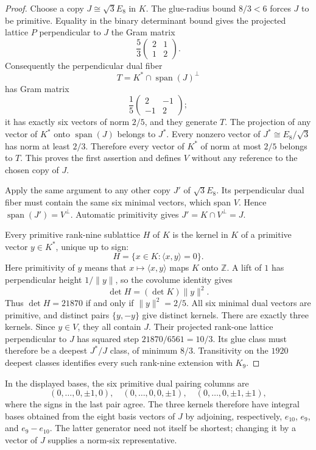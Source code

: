 \begin{proof}
Choose a copy $J\cong\sqrt3E_8$ in $K$. The glue-radius bound $8/3<6$
forces $J$ to be primitive. Equality in the binary determinant bound gives
the projected lattice $P$ perpendicular to $J$ the Gram matrix
\[
 \frac53\begin{pmatrix}2&1\\1&2\end{pmatrix}.
\]
Consequently the perpendicular dual fiber
\[
 T=K^*\cap\operatorname{span}(J)^\perp
\]
has Gram matrix
\[
 \frac15\begin{pmatrix}2&-1\\-1&2\end{pmatrix};
\]
it has exactly six vectors of norm $2/5$, and they generate $T$.
The projection of any vector of $K^*$ onto $\operatorname{span}(J)$
belongs to $J^*$. Every nonzero vector of $J^*\cong E_8/\sqrt3$ has
norm at least $2/3$. Therefore every vector of $K^*$ of norm at most
$2/5$ belongs to $T$. This proves the first assertion and defines $V$
without any reference to the chosen copy of $J$.

Apply the same argument to any other copy $J'$ of $\sqrt3E_8$.
Its perpendicular dual fiber must contain the same six minimal vectors,
which span $V$. Hence $\operatorname{span}(J')=V^\perp$.
Automatic primitivity gives $J'=K\cap V^\perp=J$.

Every primitive rank-nine sublattice $H$ of $K$ is the kernel in $K$
of a primitive vector $y\in K^*$, unique up to sign:
\[
 H=\{x\in K:\langle x,y\rangle=0\}.
\]
Here primitivity of $y$ means that $x\mapsto\langle x,y\rangle$
maps $K$ onto $\mathbb Z$. A lift of $1$ has perpendicular height
$1/\|y\|$, so the covolume identity gives
\[
 \det H=(\det K)\|y\|^2.
\]
Thus $\det H=21870$ if and only if $\|y\|^2=2/5$.
All six minimal dual vectors are primitive, and distinct pairs
$\{y,-y\}$ give distinct kernels. There are exactly three kernels.
Since $y\in V$, they all contain $J$. Their projected rank-one lattice
perpendicular to $J$ has squared step
$21870/6561=10/3$. Its glue class must therefore be a deepest
$J^*/J$ class, of minimum $8/3$. Transitivity on the $1920$ deepest
classes identifies every such rank-nine extension with $K_9$.
\end{proof}

In the displayed bases, the six primitive dual pairing columns are
\[
 (0,\ldots,0,\pm1,0),\quad
 (0,\ldots,0,0,\pm1),\quad
 (0,\ldots,0,\pm1,\pm1),
\]
where the signs in the last pair agree. The three kernels therefore
have integral bases obtained from the eight basis vectors of $J$ by
adjoining, respectively, $e_{10}$, $e_9$, and $e_9-e_{10}$.
The latter generator need not itself be shortest; changing it by a
vector of $J$ supplies a norm-six representative.

